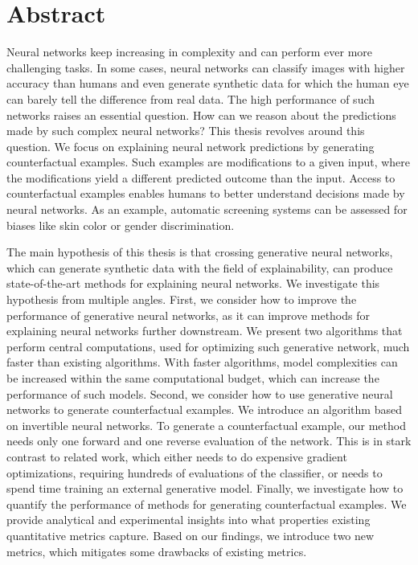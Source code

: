 \documentclass[11pt,a4paper,twoside,openright,final]{memoir}
\begin{document}
\frontmatter
\cleardoublepage
\chapter*{{\Huge Abstract}}


Neural networks keep increasing in complexity and can perform ever more challenging tasks.
In some cases, neural networks can classify images with higher accuracy than humans and even generate synthetic data for which the human eye can barely tell the difference from real data. 
The high performance of such networks raises an essential question.
How can we reason about the predictions made by such complex neural networks?
This thesis revolves around this question.
We focus on explaining neural network predictions by generating counterfactual examples. 
Such examples are modifications to a given input, where the modifications yield a different predicted outcome than the input.
Access to counterfactual examples enables humans to better understand decisions made by neural networks.
As an example, automatic screening systems can be assessed for biases like skin color or gender discrimination. 

The main hypothesis of this thesis is that crossing generative neural networks, which can generate synthetic data with the field of explainability, can produce state-of-the-art methods for explaining neural networks.
We investigate this hypothesis from multiple angles.
First, we consider how to improve the performance of generative neural networks, as it can improve methods for explaining neural networks further downstream.
We present two algorithms that perform central computations, used for optimizing such generative network, much faster than existing algorithms. 
With faster algorithms, model complexities can be increased within the same computational budget, which can increase the performance of such models.
Second, we consider how to use generative neural networks to generate counterfactual examples.
We introduce an algorithm based on invertible neural networks.
To generate a counterfactual example, our method needs only one forward and one reverse evaluation of the network.
This is in stark contrast to related work, which either needs to do expensive gradient optimizations, requiring hundreds of evaluations of the classifier, or needs to spend time training an external generative model.
Finally, we investigate how to quantify the performance of methods for generating counterfactual examples. 
We provide analytical and experimental insights into what properties existing quantitative metrics capture. 
Based on our findings, we introduce two new metrics, which mitigates some drawbacks of existing metrics. 
\end{document}
